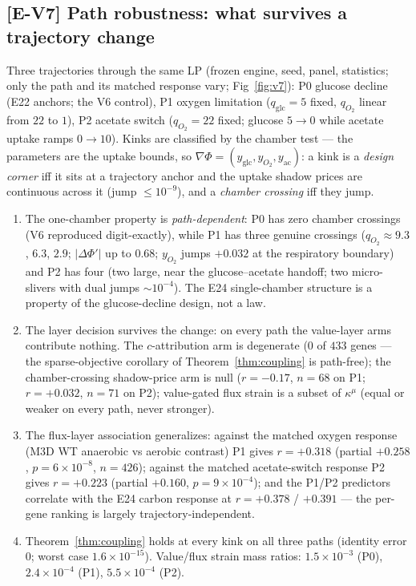 \documentclass[11pt,a4paper]{article}
\theoremstyle{plain}
\theoremstyle{definition}
\theoremstyle{remark}
\newcommand{\kmu}{\kappa^{\mu}}
\begin{document}
\subsection{[E-V7] Path robustness: what survives a trajectory change}
Three trajectories through the same LP (frozen engine, seed, panel,
statistics; only the path and its matched response vary; Fig~\ref{fig:v7}): P0 glucose
decline (E22 anchors; the V6 control), P1 oxygen limitation
($q_{\mathrm{glc}} = 5$ fixed, $q_{O_2}$ linear from $22$ to $1$),
P2 acetate switch ($q_{O_2} = 22$ fixed; glucose $5 \to 0$ while
acetate uptake ramps $0 \to 10$). Kinks are classified by the
chamber test --- the parameters are the uptake bounds, so
$\nabla\Phi = (y_{\mathrm{glc}}, y_{O_2}, y_{\mathrm{ac}})$: a kink is
a \emph{design corner} iff it sits at a trajectory anchor and the
uptake shadow prices are continuous across it (jump $\le 10^{-9}$),
and a \emph{chamber crossing} iff they jump.
\begin{enumerate}[label=(\roman*),leftmargin=2em]
\item The one-chamber property is \emph{path-dependent}: P0 has zero
      chamber crossings (V6 reproduced digit-exactly), while P1 has
      three genuine crossings ($q_{O_2} \approx 9.3$, $6.3$, $2.9$;
      $|\Delta\Phi'|$ up to $0.68$; $y_{O_2}$ jumps $+0.032$ at the
      respiratory boundary) and P2 has four (two large, near the
      glucose--acetate handoff; two micro-slivers with dual jumps
      $\sim 10^{-4}$). The E24 single-chamber structure is a property
      of the glucose-decline design, not a law.
\item The layer decision survives the change: on every path the
      value-layer arms contribute nothing. The $c$-attribution arm is
      degenerate ($0$ of $433$ genes --- the sparse-objective
      corollary of Theorem~\ref{thm:coupling} is path-free); the
      chamber-crossing shadow-price arm is null ($r = -0.17$,
      $n = 68$ on P1; $r = +0.032$, $n = 71$ on P2); value-gated flux
      strain is a subset of $\kmu$ (equal or weaker on every path,
      never stronger).
\item The flux-layer association generalizes: against the matched
      oxygen response (M3D WT anaerobic vs aerobic contrast) P1 gives
      $r = +0.318$ (partial $+0.258$, $p = 6 \times 10^{-8}$,
      $n = 426$); against the matched acetate-switch response P2
      gives $r = +0.223$ (partial $+0.160$, $p = 9 \times
      10^{-4}$); and the P1/P2 predictors correlate with the E24
      carbon response at $r = +0.378$ / $+0.391$ --- the per-gene
      ranking is largely trajectory-independent.
\item Theorem~\ref{thm:coupling} holds at every kink on all three
      paths (identity error $0$; worst case $1.6 \times 10^{-15}$).
      Value/flux strain mass ratios: $1.5 \times 10^{-3}$ (P0),
      $2.4 \times 10^{-4}$ (P1), $5.5 \times 10^{-4}$ (P2).
\end{enumerate}
\end{document}
